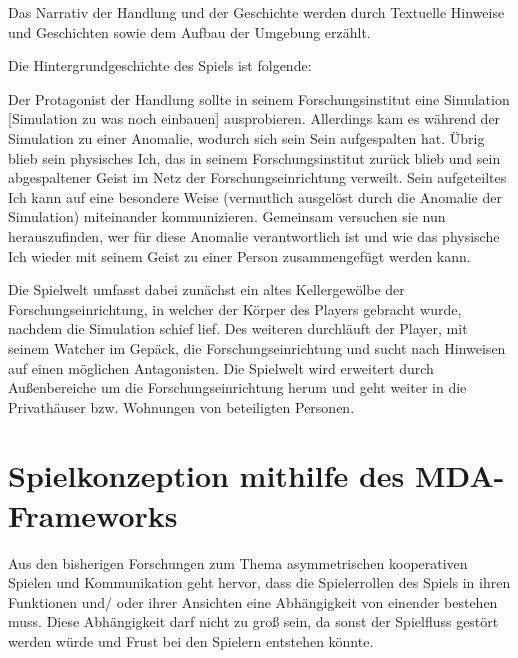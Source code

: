 Das Narrativ der Handlung und der Geschichte werden durch Textuelle Hinweise und Geschichten sowie dem Aufbau der Umgebung erzählt. 


Die Hintergrundgeschichte des Spiels ist folgende:

Der Protagonist der Handlung sollte in seinem Forschungsinstitut eine Simulation [Simulation zu was noch einbauen] ausprobieren. Allerdings kam es während der Simulation zu einer Anomalie, wodurch sich sein Sein aufgespalten hat. Übrig blieb sein physisches Ich, das in seinem Forschungsinstitut zurück blieb und sein abgespaltener Geist im Netz der Forschungseinrichtung verweilt. Sein aufgeteiltes Ich kann auf eine besondere Weise (vermutlich ausgelöst durch die Anomalie der Simulation) miteinander kommunizieren. Gemeinsam versuchen sie nun herauszufinden, wer für diese Anomalie verantwortlich ist und wie das physische Ich wieder mit seinem Geist zu einer Person zusammengefügt werden kann.


Die Spielwelt umfasst dabei zunächst ein altes Kellergewölbe der Forschungseinrichtung, in welcher der Körper des Players gebracht wurde, nachdem die Simulation schief lief. Des weiteren durchläuft der Player, mit seinem Watcher im Gepäck, die Forschungseinrichtung und sucht nach Hinweisen auf einen möglichen Antagonisten. Die Spielwelt wird erweitert durch Außenbereiche um die Forschungseinrichtung herum und geht weiter in die Privathäuser bzw. Wohnungen von beteiligten Personen.

\section{Spielkonzeption mithilfe des MDA-Frameworks}
Aus den bisherigen Forschungen zum Thema asymmetrischen kooperativen Spielen und Kommunikation geht hervor, dass die Spielerrollen des Spiels in ihren Funktionen und/ oder ihrer Ansichten eine Abhängigkeit von einender bestehen muss. Diese Abhängigkeit darf nicht zu groß sein, da sonst der Spielfluss gestört werden würde und Frust bei den Spielern entstehen könnte.


